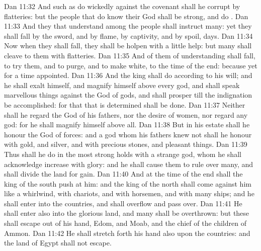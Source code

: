 \vs Dan 11:32 And such as do wickedly against the covenant shall he corrupt by flatteries: but the people that do know their God shall be strong, and do .
\vs Dan 11:33 And they that understand among the people shall instruct many: yet they shall fall by the sword, and by flame, by captivity, and by spoil,  days.
\vs Dan 11:34 Now when they shall fall, they shall be holpen with a little help: but many shall cleave to them with flatteries.
\vs Dan 11:35 And  of them of understanding shall fall, to try them, and to purge, and to make  white,  to the time of the end: because  yet for a time appointed.
\vs Dan 11:36 And the king shall do according to his will; and he shall exalt himself, and magnify himself above every god, and shall speak marvellous things against the God of gods, and shall prosper till the indignation be accomplished: for that that is determined shall be done.
\vs Dan 11:37 Neither shall he regard the God of his fathers, nor the desire of women, nor regard any god: for he shall magnify himself above all.
\vs Dan 11:38 But in his estate shall he honour the God of forces: and a god whom his fathers knew not shall he honour with gold, and silver, and with precious stones, and pleasant things.
\vs Dan 11:39 Thus shall he do in the most strong holds with a strange god, whom he shall acknowledge  increase with glory: and he shall cause them to rule over many, and shall divide the land for gain.
\vs Dan 11:40 And at the time of the end shall the king of the south push at him: and the king of the north shall come against him like a whirlwind, with chariots, and with horsemen, and with many ships; and he shall enter into the countries, and shall overflow and pass over.
\vs Dan 11:41 He shall enter also into the glorious land, and many  shall be overthrown: but these shall escape out of his hand,  Edom, and Moab, and the chief of the children of Ammon.
\vs Dan 11:42 He shall stretch forth his hand also upon the countries: and the land of Egypt shall not escape.
